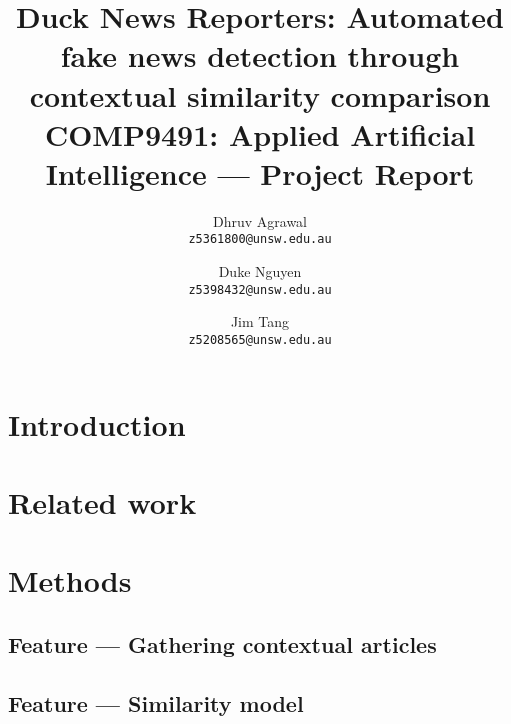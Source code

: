 \documentclass{article}
\begin{document}
\pagestyle{fancy}
\fancyhf{}
\cfoot[C]{\thepage}

\renewcommand{\headrulewidth}{1pt}
\renewcommand{\footrulewidth}{0.5pt}

\newcommand{\sectiontitle}{}
\newcommand{\subsectiontitle}{}
\newcommand{\sectionlabel}{\ifdefempty{\subsectiontitle}{\sectiontitle}{\sectiontitle/\subsectiontitle}}
\newcommand{\newsection}[1]{\section{#1}\renewcommand{\sectiontitle}{#1}\renewcommand{\subsectiontitle}{}}
\newcommand{\newsubsection}[1]{\subsection{#1}\renewcommand{\subsectiontitle}{#1}}

\title{\textbf{Duck News Reporters: Automated fake news detection through contextual similarity comparison}\\\vspace*{12pt}\large{COMP9491: Applied Artificial Intelligence --- Project Report}}
\author{%
  Dhruv Agrawal\\
  \texttt{z5361800@unsw.edu.au}
  \and
  Duke Nguyen\\
  \texttt{z5398432@unsw.edu.au}
  \and
  Jim Tang\\
  \texttt{z5208565@unsw.edu.au}
}

\maketitle
\thispagestyle{empty}

\listoftodos %

\newsection{Introduction}


\newsection{Related work}


\newsection{Methods}

\newsubsection{Feature --- Gathering contextual articles}


\newsubsection{Feature --- Similarity model}
\end{document}

